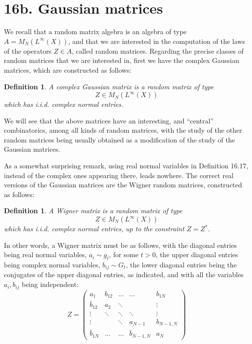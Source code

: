 \documentclass[12pt]{amsbook}
\newtheorem{definition}[theorem]{Definition}
\begin{document}
\section*{16b. Gaussian matrices}

We recall that a random matrix algebra is an algebra of type $A=M_N(L^\infty(X))$, and that we are interested in the computation of the laws of the operators $Z\in A$, called random matrices. Regarding the precise classes of random matrices that we are interested in, first we have the complex Gaussian matrices, which are constructed as follows:

\begin{definition}
A complex Gaussian matrix is a random matrix of type
$$Z\in M_N(L^\infty(X))$$
which has i.i.d. complex normal entries.
\end{definition}

We will see that the above matrices have an interesting, and ``central'' combinatorics, among all kinds of random matrices, with the study of the other random matrices being usually obtained as a modification of the study of the Gaussian matrices.

\bigskip

As a somewhat surprising remark, using real normal variables in Definition 16.17, instead of the complex ones appearing there, leads nowhere. The correct real versions of the Gaussian matrices are the Wigner random matrices, constructed as follows: 

\begin{definition}
A Wigner matrix is a random matrix of type
$$Z\in M_N(L^\infty(X))$$
which has i.i.d. complex normal entries, up to the constraint $Z=Z^*$.
\end{definition}

In other words, a Wigner matrix must be as follows, with the diagonal entries being real normal variables, $a_i\sim g_t$, for some $t>0$, the upper diagonal entries being complex normal variables, $b_{ij}\sim G_t$, the lower diagonal entries being the conjugates of the upper diagonal entries, as indicated, and with all the variables $a_i,b_{ij}$ being independent: 
$$Z=\begin{pmatrix}
a_1&b_{12}&\ldots&\ldots&b_{1N}\\
\bar{b}_{12}&a_2&\ddots&&\vdots\\
\vdots&\ddots&\ddots&\ddots&\vdots\\
\vdots&&\ddots&a_{N-1}&b_{N-1,N}\\
\bar{b}_{1N}&\ldots&\ldots&\bar{b}_{N-1,N}&a_N
\end{pmatrix}$$
\end{document}
